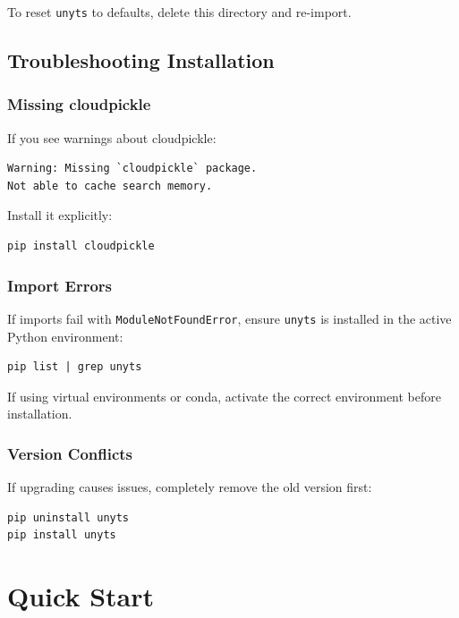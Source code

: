 \documentclass[11pt,a4paper]{report}
\begin{document}
To reset \texttt{unyts} to defaults, delete this directory and re-import.

\section{Troubleshooting Installation}

\subsection{Missing cloudpickle}

If you see warnings about cloudpickle:
\begin{lstlisting}[style=bashstyle]
Warning: Missing `cloudpickle` package. 
Not able to cache search memory.
\end{lstlisting}

Install it explicitly:
\begin{lstlisting}[style=bashstyle]
pip install cloudpickle
\end{lstlisting}

\subsection{Import Errors}

If imports fail with \texttt{ModuleNotFoundError}, ensure \texttt{unyts} is installed in the active Python environment:
\begin{lstlisting}[style=bashstyle]
pip list | grep unyts
\end{lstlisting}

If using virtual environments or conda, activate the correct environment before installation.

\subsection{Version Conflicts}

If upgrading causes issues, completely remove the old version first:
\begin{lstlisting}[style=bashstyle]
pip uninstall unyts
pip install unyts
\end{lstlisting}


\chapter{Quick Start}
\end{document}
